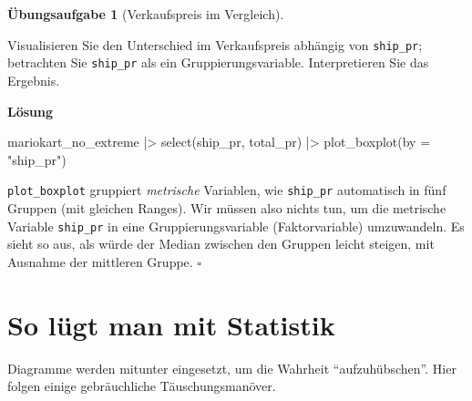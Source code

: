 \documentclass[
  letterpaper,
  twoside,
  open=any]{scrbook}
\newenvironment{Shaded}{\begin{snugshade}}{\end{snugshade}}
\newcommand{\AttributeTok}[1]{\textcolor[rgb]{0.40,0.45,0.13}{#1}}
\newcommand{\FunctionTok}[1]{\textcolor[rgb]{0.28,0.35,0.67}{#1}}
\newcommand{\NormalTok}[1]{\textcolor[rgb]{0.00,0.23,0.31}{#1}}
\newcommand{\SpecialCharTok}[1]{\textcolor[rgb]{0.37,0.37,0.37}{#1}}
\newcommand{\StringTok}[1]{\textcolor[rgb]{0.13,0.47,0.30}{#1}}
\theoremstyle{definition}
\newtheorem{exercise}{Übungsaufgabe}[chapter]
\theoremstyle{definition}
\theoremstyle{definition}
\theoremstyle{remark}
\begin{document}
\begin{exercise}[Verkaufspreis im
Vergleich]\protect\hypertarget{exr-diff-plot}{}\label{exr-diff-plot}

Visualisieren Sie den Unterschied im Verkaufspreis abhängig von
\texttt{ship\_pr}; betrachten Sie \texttt{ship\_pr} als ein
Gruppierungsvariable. Interpretieren Sie das Ergebnis.

\textbf{Lösung}

\begin{Shaded}
\begin{Highlighting}[]
\NormalTok{mariokart\_no\_extreme }\SpecialCharTok{|\textgreater{}} 
  \FunctionTok{select}\NormalTok{(ship\_pr, total\_pr) }\SpecialCharTok{|\textgreater{}} 
  \FunctionTok{plot\_boxplot}\NormalTok{(}\AttributeTok{by =} \StringTok{"ship\_pr"}\NormalTok{)}
\end{Highlighting}
\end{Shaded}

\texttt{plot\_boxplot} gruppiert \emph{metrische} Variablen, wie
\texttt{ship\_pr} automatisch in fünf Gruppen (mit gleichen Ranges). Wir
müssen also nichts tun, um die metrische Variable \texttt{ship\_pr} in
eine Gruppierungsvariable (Faktorvariable) umzuwandeln. Es sieht so aus,
als würde der Median zwischen den Gruppen leicht steigen, mit Ausnahme
der mittleren Gruppe. \(\square\)

\end{exercise}

\section{So lügt man mit Statistik}\label{so-luxfcgt-man-mit-statistik}

Diagramme werden mitunter eingesetzt, um die Wahrheit
\enquote{aufzuhübschen}. Hier folgen einige gebräuchliche
Täuschungsmanöver.
\end{document}
